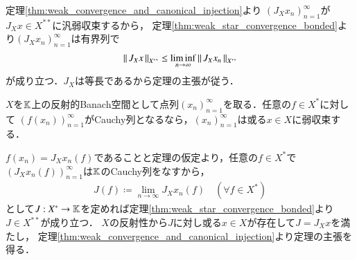 	\begin{prf}
		定理\ref{thm:weak_convergence_and_canonical_injection}より
		$(J_X x_n)_{n=1}^{\infty}$が$J_X x \in X^{**}$に汎弱収束するから，
		定理\ref{thm:weak_star_convergence_bonded}より$(J_X x_n)_{n=1}^{\infty}$は有界列で
		\begin{align}
			\left\|\, J_X x\, \right\|_{X^{**}} \leq \liminf_{n \to \infty} \left\|\, J_X x_n\, \right\|_{X^{**}}
		\end{align}
		が成り立つ．$J_X$は等長であるから定理の主張が従う．
		\QED
	\end{prf}
	
	\begin{screen}
		\begin{thm}[反射的Banach空間の点列が弱収束するための十分条件]
			$X$を$\mathbb{K}$上の反射的Banach空間として点列$(x_n)_{n=1}^{\infty}$を取る．任意の$f \in X^*$に対して
			$\left( f(x_n) \right)_{n=1}^{\infty}$がCauchy列となるなら，$(x_n)_{n=1}^{\infty}$は或る$x \in X$に弱収束する．
		\end{thm}
	\end{screen}
	
	\begin{prf}
		$f(x_n) = J_X x_n(f)$であることと定理の仮定より，任意の$f \in X^*$で$\left( J_X x_n(f) \right)_{n=1}^{\infty}$は$\mathbb{K}$のCauchy列をなすから，
		\begin{align}
			J(f) \coloneqq \lim_{n \to \infty} J_X x_n(f) \quad (\forall f \in X^*)
		\end{align}
		として$J:X^* \rightarrow \mathbb{K}$を定めれば定理\ref{thm:weak_star_convergence_bonded}より$J \in X^{**}$が成り立つ．
		$X$の反射性から$J$に対し或る$x \in X$が存在して$J = J_X x$を満たし，
		定理\ref{thm:weak_convergence_and_canonical_injection}より定理の主張を得る．
		\QED
	\end{prf}